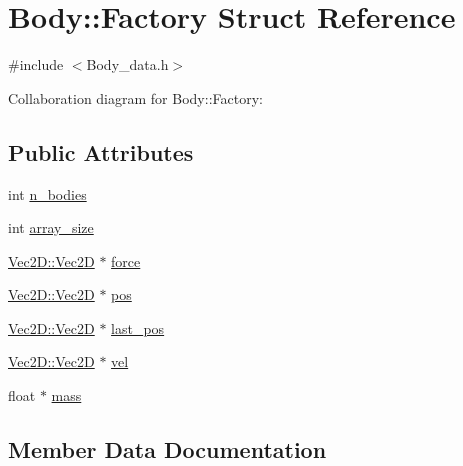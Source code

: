 \hypertarget{struct_body_1_1_factory}{}\section{Body\+:\+:Factory Struct Reference}
\label{struct_body_1_1_factory}


{\ttfamily \#include $<$Body\+\_\+data.\+h$>$}



Collaboration diagram for Body\+:\+:Factory\+:
\subsection*{Public Attributes}
\begin{DoxyCompactItemize}
\item 
int \mbox{\hyperlink{struct_body_1_1_factory_a7dcf3476dec658132660228d635b6797}{n\+\_\+bodies}}
\item 
int \mbox{\hyperlink{struct_body_1_1_factory_aad8ad89bee8b5be3a08e66987d5c1574}{array\+\_\+size}}
\item 
\mbox{\hyperlink{struct_vec2_d_1_1_vec2_d}{Vec2\+D\+::\+Vec2D}} $\ast$ \mbox{\hyperlink{struct_body_1_1_factory_a71b0331bc85a2cc753d895408d246283}{force}}
\item 
\mbox{\hyperlink{struct_vec2_d_1_1_vec2_d}{Vec2\+D\+::\+Vec2D}} $\ast$ \mbox{\hyperlink{struct_body_1_1_factory_abf9af0a85100a3d9070be4b9b30a72ce}{pos}}
\item 
\mbox{\hyperlink{struct_vec2_d_1_1_vec2_d}{Vec2\+D\+::\+Vec2D}} $\ast$ \mbox{\hyperlink{struct_body_1_1_factory_a86adc75afd605268c684e40d9f6712c7}{last\+\_\+pos}}
\item 
\mbox{\hyperlink{struct_vec2_d_1_1_vec2_d}{Vec2\+D\+::\+Vec2D}} $\ast$ \mbox{\hyperlink{struct_body_1_1_factory_a8e66b2894de92733dc837e30c455b59d}{vel}}
\item 
float $\ast$ \mbox{\hyperlink{struct_body_1_1_factory_a9bdd48e0b1d53c8a864c708011a1720e}{mass}}
\end{DoxyCompactItemize}


\subsection{Member Data Documentation}
\mbox{\label{struct_body_1_1_factory_aad8ad89bee8b5be3a08e66987d5c1574}} 
